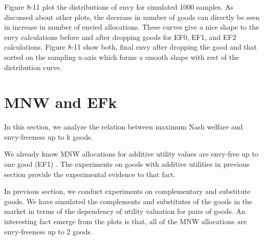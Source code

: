 

Figure 8-11 plot the distributions of envy for simulated 1000 samples. As discussed about other plots, the decrease in number of goods can directly be seen in increase in number of envied allocations. These curves give a nice shape to the envy calculations before and after dropping goods for EF0, EF1, and EF2 calculations. Figure 8-11 show both, final envy after dropping the good and that sorted on the sampling x-axis which forms a smooth shape with rest of the distribution curve.

\section{MNW and EFk}
\label{section_proof}
In this section, we analyze the relation between maximum Nash welfare and envy-freeness up to k goods.

We already know MNW allocations for additive utility values are envy-free up to one good (EF1) \cite{caragiannis2016unreasonable}. The experiments on goods with additive utilities in previous section provide the experimental evidence to that fact.

In previous section, we conduct experiments on complementary and substitute goods. We have simulated the complements and substitutes of the goods in the market in terms of the dependency of utility valuation for pairs of goods. An interesting fact emerge from the plots is that, all of the MNW allocations are envy-freeness up to 2 goods.

